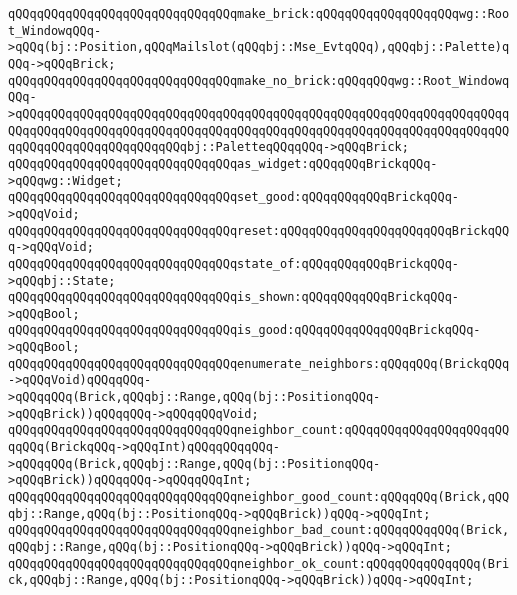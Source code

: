 \newline
\verb|qQQqqQQqqQQqqQQqqQQqqQQqqQQqqQQqmake_brick:qQQqqQQqqQQqqQQqqQQqwg::Root_WindowqQQq->qQQq(bj::Position,qQQqMailslot(qQQqbj::Mse_EvtqQQq),qQQqbj::Palette)qQQq->qQQqBrick;|\newline
\verb|qQQqqQQqqQQqqQQqqQQqqQQqqQQqqQQqmake_no_brick:qQQqqQQqwg::Root_WindowqQQq->qQQqqQQqqQQqqQQqqQQqqQQqqQQqqQQqqQQqqQQqqQQqqQQqqQQqqQQqqQQqqQQqqQQqqQQqqQQqqQQqqQQqqQQqqQQqqQQqqQQqqQQqqQQqqQQqqQQqqQQqqQQqqQQqqQQqqQQqqQQqqQQqqQQqqQQqqQQqqQQqqQQqbj::PaletteqQQqqQQq->qQQqBrick;|\newline
\newline
\verb|qQQqqQQqqQQqqQQqqQQqqQQqqQQqqQQqas_widget:qQQqqQQqBrickqQQq->qQQqwg::Widget;|\newline
\verb|qQQqqQQqqQQqqQQqqQQqqQQqqQQqqQQqset_good:qQQqqQQqqQQqBrickqQQq->qQQqVoid;|\newline
\verb|qQQqqQQqqQQqqQQqqQQqqQQqqQQqqQQqreset:qQQqqQQqqQQqqQQqqQQqqQQqBrickqQQq->qQQqVoid;|\newline
\newline
\verb|qQQqqQQqqQQqqQQqqQQqqQQqqQQqqQQqstate_of:qQQqqQQqqQQqBrickqQQq->qQQqbj::State;|\newline
\verb|qQQqqQQqqQQqqQQqqQQqqQQqqQQqqQQqis_shown:qQQqqQQqqQQqBrickqQQq->qQQqBool;|\newline
\verb|qQQqqQQqqQQqqQQqqQQqqQQqqQQqqQQqis_good:qQQqqQQqqQQqqQQqBrickqQQq->qQQqBool;|\newline
\newline
\verb|qQQqqQQqqQQqqQQqqQQqqQQqqQQqqQQqenumerate_neighbors:qQQqqQQq(BrickqQQq->qQQqVoid)qQQqqQQq->qQQqqQQq(Brick,qQQqbj::Range,qQQq(bj::PositionqQQq->qQQqBrick))qQQqqQQq->qQQqqQQqVoid;|\newline
\verb|qQQqqQQqqQQqqQQqqQQqqQQqqQQqqQQqneighbor_count:qQQqqQQqqQQqqQQqqQQqqQQqqQQq(BrickqQQq->qQQqInt)qQQqqQQqqQQq->qQQqqQQq(Brick,qQQqbj::Range,qQQq(bj::PositionqQQq->qQQqBrick))qQQqqQQq->qQQqqQQqInt;|\newline
\newline
\verb|qQQqqQQqqQQqqQQqqQQqqQQqqQQqqQQqneighbor_good_count:qQQqqQQq(Brick,qQQqbj::Range,qQQq(bj::PositionqQQq->qQQqBrick))qQQq->qQQqInt;|\newline
\verb|qQQqqQQqqQQqqQQqqQQqqQQqqQQqqQQqneighbor_bad_count:qQQqqQQqqQQq(Brick,qQQqbj::Range,qQQq(bj::PositionqQQq->qQQqBrick))qQQq->qQQqInt;|\newline
\verb|qQQqqQQqqQQqqQQqqQQqqQQqqQQqqQQqneighbor_ok_count:qQQqqQQqqQQqqQQq(Brick,qQQqbj::Range,qQQq(bj::PositionqQQq->qQQqBrick))qQQq->qQQqInt;|\newline
